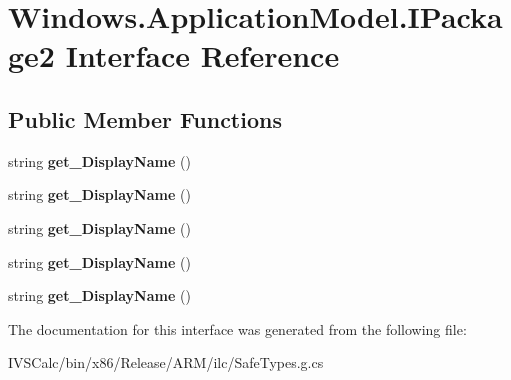 \hypertarget{interface_windows_1_1_application_model_1_1_i_package2}{}\section{Windows.\+Application\+Model.\+I\+Package2 Interface Reference}
\label{interface_windows_1_1_application_model_1_1_i_package2}
\subsection*{Public Member Functions}
\begin{DoxyCompactItemize}
\item 
\mbox{\label{interface_windows_1_1_application_model_1_1_i_package2_a80a7a57243044c13600b743b81ba8cea}} 
string {\bfseries get\+\_\+\+Display\+Name} ()
\item 
\mbox{\label{interface_windows_1_1_application_model_1_1_i_package2_a80a7a57243044c13600b743b81ba8cea}} 
string {\bfseries get\+\_\+\+Display\+Name} ()
\item 
\mbox{\label{interface_windows_1_1_application_model_1_1_i_package2_a80a7a57243044c13600b743b81ba8cea}} 
string {\bfseries get\+\_\+\+Display\+Name} ()
\item 
\mbox{\label{interface_windows_1_1_application_model_1_1_i_package2_a80a7a57243044c13600b743b81ba8cea}} 
string {\bfseries get\+\_\+\+Display\+Name} ()
\item 
\mbox{\label{interface_windows_1_1_application_model_1_1_i_package2_a80a7a57243044c13600b743b81ba8cea}} 
string {\bfseries get\+\_\+\+Display\+Name} ()
\end{DoxyCompactItemize}


The documentation for this interface was generated from the following file\+:\begin{DoxyCompactItemize}
\item 
I\+V\+S\+Calc/bin/x86/\+Release/\+A\+R\+M/ilc/Safe\+Types.\+g.\+cs\end{DoxyCompactItemize}
